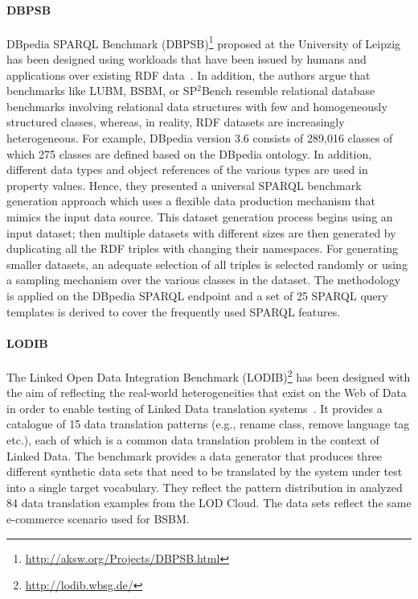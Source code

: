 \paragraph{DBPSB} DBpedia SPARQL Benchmark (DBPSB)\footnote{\url{http://aksw.org/Projects/DBPSB.html}} proposed at the University of Leipzig has been designed using workloads that have been issued by humans and applications over existing RDF data~\cite{Morsey2011,Morsey:2012:UBR:2900929.2901031}. In addition, the authors argue that benchmarks like LUBM, BSBM, or SP$^2$Bench resemble relational database benchmarks involving relational data structures with few and homogeneously structured classes, whereas, in reality, RDF datasets are increasingly heterogeneous. For example, DBpedia version 3.6 consists of 289,016 classes of which 275 classes are defined based on the DBpedia ontology. In addition, different data types and object references of the various types are
used in property values. Hence, they presented a universal SPARQL benchmark generation approach which uses a flexible data production mechanism that mimics the input data source. This dataset generation process begins using an input dataset; then multiple datasets with different sizes  are then generated by duplicating all the RDF triples with changing their namespaces.  For generating smaller datasets, an adequate selection of all triples is selected randomly or using a sampling mechanism over the various classes in the dataset. \iffalse The goal of the query analysis and clustering is to detect prototypical queries on the basis of their frequent usage and similarity.\fi The methodology is applied on the DBpedia SPARQL endpoint and a set of 25 SPARQL query templates is derived to cover the frequently used SPARQL features.

\paragraph{LODIB} The Linked Open Data Integration Benchmark (LODIB)\footnote{\url{http://lodib.wbsg.de/}} has been designed with the aim of reflecting the real-world heterogeneities that exist on the Web of Data in order to enable testing of Linked Data translation systems~\cite{DBLP:conf/www/RiveroSBR12}. It provides a catalogue of 15 data translation patterns (e.g., rename class, remove language tag etc.), each of which is a common data translation problem in the context of Linked Data. The benchmark provides a data generator that produces three different synthetic data sets that need to be translated
by the system under test into a single target vocabulary. They  reflect the pattern distribution in analyzed 84 data translation examples from the LOD Cloud. The data sets reflect the same e-commerce scenario used for BSBM.


